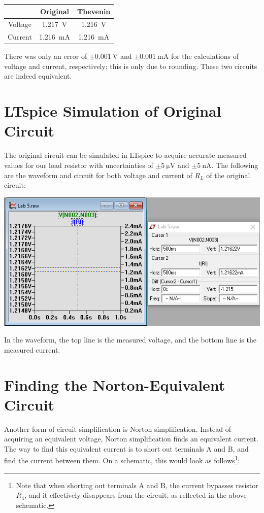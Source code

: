 \documentclass{article}
\begin{document}
\begin{tabular}{c | c c}
            & Original & Thevenin \\ \hline
    Voltage & \SI{1.217}{\volt} & \SI{1.216}{\volt}\\
    Current & \SI{1.216}{\milli\ampere} & \SI{1.216}{\milli\ampere}
\end{tabular}

There was only an error of \(\pm \SI{0.001}{\volt}\) and
\(\pm \SI{0.001}{\milli\ampere}\) for the calculations of
voltage and current, respectively; this is only due to rounding.
These two circuits are indeed equivalent.

\pagebreak

\section{LTspice Simulation of Original Circuit} The original
circuit can be simulated in LTspice to acquire accurate
measured values for our load resistor with uncertainties
of \(\pm \SI{5}{\micro\volt}\) and \(\pm \SI{5}{\nano\ampere}\). The following are
the waveform and circuit for both voltage and current
of \(R_L\) of the original circuit:

\includegraphics[width=\textwidth]{Images/circuit0_RL_Cursor.png}

In the waveform, the top line is the measured voltage,
and the bottom line is the measured current.

\section{Finding the Norton-Equivalent Circuit} Another
form of circuit simplification is Norton simplification.
Instead of acquiring an equivalent voltage, Norton simplification
finds an equivalent current. The way to find this equivalent
current is to short out terminals A and B, and find the current
between them. On a schematic, this would look as
follows\footnote{Note that when shorting out terminals A and B, the current
bypasses resistor \(R_4\), and it effectively disappears from
the circuit, as reflected in the above schematic.}:
\end{document}
